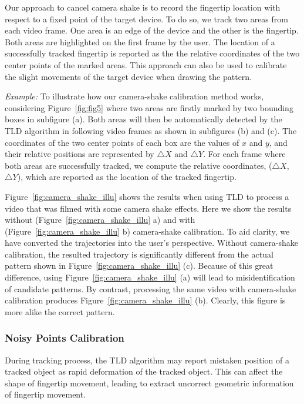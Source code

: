         Our approach to cancel camera shake is to record the fingertip
        location with respect to a fixed point of the target device. To do so, we track two
        areas from each video frame. One area is an edge of the device and
        the other is the fingertip. Both areas are highlighted on the
        first frame by the user.
        The location of a successfully tracked fingertip is reported as the
        the relative coordinates of the two center points of the marked areas.
        This approach can also be used to calibrate the slight movements of the target device when drawing the pattern.

        \noindent \emph{Example:} To illustrate how our camera-shake calibration method  works, considering
        Figure~\ref{fig:fig5} where two areas are firstly marked by two
        bounding boxes in subfigure (a).
        Both areas will
        then be automatically detected by the TLD algorithm in following video
        frames as shown in subfigures (b) and (c).
        The coordinates of the two center points of each box are the values of $x$ and $y$, and their relative positions are represented by
        $\triangle X$ and $\triangle Y$.
        For each frame
        where both areas are successfully tracked, we
        compute the relative coordinates, ($\triangle X$, $\triangle Y$), which are reported as the location of the tracked fingertip.

        Figure~\ref{fig:camera_shake_illu} shows the results when using TLD to process a video that was filmed with some camera shake effects.
        Here we show the results without (Figure~\ref{fig:camera_shake_illu} a) and with (Figure~\ref{fig:camera_shake_illu} b) camera-shake calibration. To aid clarity, we have
        converted the trajectories into the user's perspective. Without
        camera-shake calibration, the resulted trajectory is significantly different from the actual pattern shown in Figure~\ref{fig:camera_shake_illu} (c).
        Because of this great difference, using Figure~\ref{fig:camera_shake_illu} (a)  will lead to misidentification of
        candidate patterns. By contrast, processing the same video
         with camera-shake calibration  produces Figure~\ref{fig:camera_shake_illu} (b). Clearly, this figure is more
        alike the correct pattern.

        \subsubsection{Noisy Points Calibration}
            During tracking process, the TLD algorithm may report mistaken position of a tracked object as rapid deformation of the tracked object. This can affect the shape of fingertip movement, leading to extract uncorrect geometric information of fingertip movement.

